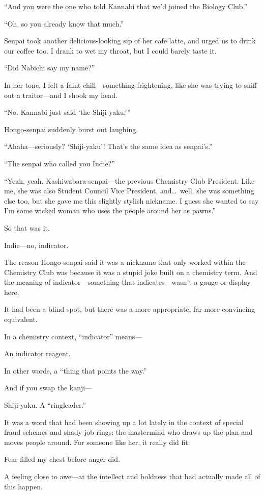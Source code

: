 \documentclass[
    a4paper,
    12pt,
    twoside,
    openany,
    UTF8,
    fontset=windows
]{ctexbook}
\begin{document}
``And you were the one who told Kannabi that we'd joined the Biology Club.''

``Oh, so you already know that much.''

Senpai took another delicious-looking sip of her cafe latte, and urged us to drink our coffee too. I drank to wet my throat, but I could barely taste it.

``Did Nabichi say my name?''

In her tone, I felt a faint chill---something frightening, like she was trying to sniff out a traitor---and I shook my head.

``No. Kannabi just said `the Shiji-yaku.'''

Hongo-senpai suddenly burst out laughing.

``Ahaha---seriously? `Shiji-yaku'! That's the same idea as senpai's.''

``The senpai who called you Indie?''

``Yeah, yeah. Kashiwabara-senpai---the previous Chemistry Club President. Like me, she was also Student Council Vice President, and\dots\ well, she was something else too, but she gave me this slightly stylish nickname. I guess she wanted to say I'm some wicked woman who uses the people around her as pawns.''

So that was it.

Indie---no, indicator.

The reason Hongo-senpai said it was a nickname that only worked within the Chemistry Club was because it was a stupid joke built on a chemistry term. And the meaning of indicator---something that indicates---wasn't a gauge or display here.

It had been a blind spot, but there was a more appropriate, far more convincing equivalent.

In a chemistry context, ``indicator'' means---

An indicator reagent.

In other words, a ``thing that points the way.''

And if you swap the kanji---

Shiji-yaku. A ``ringleader.''

It was a word that had been showing up a lot lately in the context of special fraud schemes and shady job rings: the mastermind who draws up the plan and moves people around. For someone like her, it really did fit.

Fear filled my chest before anger did.

A feeling close to awe---at the intellect and boldness that had actually made all of this happen.
\end{document}

